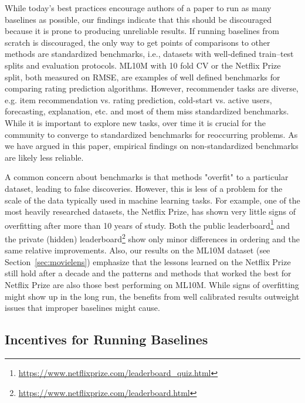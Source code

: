 \documentclass{article}
\begin{document}
While today's best practices encourage authors of a paper to run as many baselines as possible, our findings indicate that this should be discouraged because it is prone to producing unreliable results.
If running baselines from scratch is discouraged, the only way to get points of comparisons to other methods are standardized benchmarks, i.e., datasets with well-defined train--test splits and evaluation protocols.
ML10M with 10 fold CV or the Netflix Prize split, both measured on RMSE, are examples of well defined benchmarks for comparing rating prediction algorithms.
However, recommender tasks are diverse, e.g. item recommendation vs. rating prediction, cold-start vs. active users, forecasting, explanation, etc. and most of them miss standardized benchmarks.
While it is important to explore new tasks, over time it is crucial for the community to converge to standardized benchmarks for reoccurring problems.
As we have argued in this paper, empirical findings on non-standardized benchmarks are likely less reliable.


A common concern about benchmarks is that methods "overfit" to a particular dataset, leading to false discoveries.
However, this is less of a problem for the scale of the data typically used in machine learning tasks.
For example, one of the most heavily researched datasets, the Netflix Prize, has shown very little signs of overfitting after more than 10 years of study.
Both the public leaderboard\footnote{\url{https://www.netflixprize.com/leaderboard_quiz.html}} and the private (hidden) leaderboard\footnote{\url{https://www.netflixprize.com/leaderboard.html}} show only minor differences in ordering and the same relative improvements.
Also, our results on the ML10M dataset (see Section~\ref{sec:movielens}) emphasize that the lessons learned on the Netflix Prize still hold after a decade and the patterns and methods that worked the best for Netflix Prize are also those best performing on ML10M.
While signs of overfitting might show up in the long run, the benefits from well calibrated results outweight issues that improper baselines might cause.


\subsection{Incentives for Running Baselines}
\end{document}
